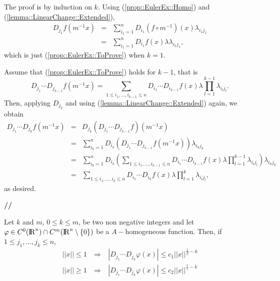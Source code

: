 \documentclass[12pt,a4paper]{amsart}
\begin{document}
{{\removelastskip\par\medskip\goodbreak{}}
The proof is by induction on ${k}$.
Using (\ref{prop::EulerEx::Homo}) and
(\ref{lemma::LinearChange::Extended}),
\begin{eqnarray}
\nonumber
{D}_{{j}_1}{f}({m}^{-1}{x})&=&
	\sum_{{i}_1=1}^{n}
	{D}_{{i}_1}({f}\circ{m}^{-1})({x})\lambda_{{i}_1{j}_1}
\\
\nonumber
&=&\sum_{{i}_1=1}^{n}{D}_{{i}_1}{f}({x}){\lambda}{\lambda}_{{i}_1{j}_1},
\end{eqnarray}
which is just (\ref{prop::EulerEx::ToProve}) when ${k}=1$.

Assume that (\ref{prop::EulerEx::ToProve}) holds for ${k}-1$,
that is
\begin{equation}\nonumber
	{D}_{{j}_1}\cdots{D}_{{j}_{{k}-1}}{f}({m}^{-1}{x})
	=\sum_{1\leq{i}_1,\ldots,{i}_{{k}-1}\leq{n}}
	{D}_{{i}_1}\cdots{D}_{{i}_{{k}-1}}{f}({x}){\lambda}
	\prod_{{l}=1}^{{k}-1}{\lambda}_{{i}_{l}{j}_{l}}.
\end{equation}
Then, applying $D_{{j}_{k}}$ and using
(\ref{lemma::LinearChange::Extended}) again, we obtain
\begin{eqnarray}
\nonumber
	{D}_{{j}_1}\cdots{D}_{{j}_{k}}{f}({m}^{-1}{x})&=&	{D}_{{j}_{k}}\left({D}_{{j}_1}\cdots{D}_{{j}_{{k}-1}}{f}\right)({m}^{-1}{x})
\\
\nonumber
	&=&
	\sum_{{i}_{k}=1}^{n}{D}_{{i}_{k}}
	\left({D}_{{j}_1}\cdots{D}_{{j}_{{k}-1}}{f}({m}^{-1}{x})\right)
	{\lambda}_{{i}_{k}{j}_{k}}
\\
\nonumber
	&=&
	\sum_{{i}_{k}=1}^{n}{D}_{{i}_{k}}
	\left(
		\sum_{1\leq{i}_1,\ldots,{i}_{{k}-1}\leq{n}}
		{D}_{{i}_1}\cdots{D}_{{i}_{{k}-1}}{f}({x}){\lambda}
		\prod_{{l}=1}^{{k}-1}{\lambda}_{{i}_{l}{j}_{l}}
	\right)
	{\lambda}_{{i}_{k}{j}_{k}}
\\
\nonumber
	&=&
	\sum_{1\leq{i}_1,\ldots,{i}_{k}\leq{n}}
	{D}_{{i}_1}\cdots{D}_{{i}_{k}}{f}({x}){\lambda}
	\prod_{{l}=1}^{k}{\lambda}_{{i}_{l}{j}_{l}},
\end{eqnarray}
as desired.
{{\bf //}\par\smallskip}

\begin{proposition}\label{prop::DPhiEstimate}
Let ${k}$ and ${m}$, $0\leq{k}\leq{m}$,
be two non negative integers and
let ${\varphi}\in C^0({{\rm I\kern-.185em R}}^{n})\cap C^{m}({{\rm I\kern-.185em R}}^{n}\setminus\{0\})$
be a ${A}-$homogeneous function.
Then, if $1\leq{j}_1,\ldots,{j}_{k}\leq{n}$,
\begin{eqnarray}
\label{eq::DPhiEstimatesMinus}
{\left|\!\left|{x}\right|\!\right|}\leq1\ &\Longrightarrow&\ 
{\left|{{D}_{{j}_1}\cdots{D}_{{j}_{k}}{\varphi}({x})}\right|}
\leq{c}_1{\left|\!\left|{x}\right|\!\right|}^{\frac{1}{\beta}-{k}}
\\
\label{eq::DPhiEstimatesPlus}
{\left|\!\left|{x}\right|\!\right|}\geq1\ &\Longrightarrow&\ 
{\left|{{D}_{{j}_1}\cdots{D}_{{j}_{k}}{\varphi}({x})}\right|}
\leq{c}_2{\left|\!\left|{x}\right|\!\right|}^{\frac{1}{\gamma}-{k}}
\end{eqnarray}
\end{proposition}

}
\end{document}
